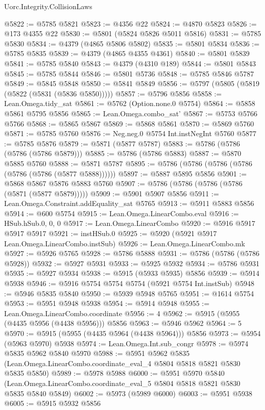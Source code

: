 \begin{lexlean}{Uorc.Integrity.CollisionLaws}
\begin{coremodule}
@5822 := @5785 @5821
@5823 := @4356 @22
@5824 := @4870 @5823
@5826 := @173 @4355 @22
@5830 := @5801 (@5824 @5826 @5011 @5816)
@5831 := @5785 @5830
@5834 := @4379 (@4865 @5806 @5802)
@5835 := @5801 @5834
@5836 := @5785 @5835
@5839 := @4379 (@4865 @4355 @4361)
@5840 := @5801 @5839
@5841 := @5785 @5840
@5843 := @4379 (@4310 @189)
@5844 := @5801 @5843
@5845 := @5785 @5844
@5846 := @5801 @5736
@5848 := @5785 @5846 @5787
@5849 := @5845 @5848
@5850 := @5841 @5849
@5856 := @5797 (@5805 (@5819 (@5822 (@5831 (@5836 @5850)))))
@5857 := @5796 @5856
@5858 := Lean.Omega.tidy_sat
@5861 := @5762 (Option.none.{0} @5754)
@5864 := @5858 @5861 @5795 @5856
@5865 := Lean.Omega.combo_sat'
@5867 := @5753 @5766 @5766
@5868 := @5865 @5867
@5869 := @5868 @5861
@5870 := @5869 @5760
@5871 := @5785 @5760
@5876 := Neg.neg.{0} @5754 Int.instNegInt @5760
@5877 := @5785 @5876
@5879 := @5871 (@5877 @5787)
@5883 := @5786 (@5786 (@5786 (@5786 @5879)))
@5885 := @5786 (@5786 @5883)
@5887 := @5870 @5885 @5760
@5888 := @5871 @5787
@5895 := @5786 (@5786 (@5786 (@5786 (@5786 (@5786 (@5877 @5888))))))
@5897 := @5887 @5895 @5856
@5901 := @5868 @5867 @5876 @5883 @5760
@5907 := @5786 (@5786 (@5786 (@5786 (@5871 (@5877 @5879)))))
@5909 := @5901 @5907 @5856
@5911 := Lean.Omega.Constraint.addEquality_sat @5765
@5913 := @5911 @5883 @5856
@5914 := @600 @5754
@5915 := Lean.Omega.LinearCombo.eval
@5916 := HSub.hSub.{0, 0, 0}
@5917 := Lean.Omega.LinearCombo
@5920 := @5916 @5917 @5917 @5917
@5921 := instHSub.{0}
@5925 := @5920 (@5921 @5917 Lean.Omega.LinearCombo.instSub)
@5926 := Lean.Omega.LinearCombo.mk
@5927 := @5926 @5765
@5928 := @5786 @5888
@5931 := @5786 (@5786 (@5786 @5928))
@5932 := @5927 @5931
@5933 := @5925 @5932
@5934 := @5786 @5931
@5935 := @5927 @5934
@5938 := @5915 (@5933 @5935) @5856
@5939 := @5914 @5938
@5946 := @5916 @5754 @5754 @5754 (@5921 @5754 Int.instSub)
@5948 := @5946 @5835 @5840
@5950 := @5939 @5948 @5765
@5951 := @1614 @5754
@5953 := @5951 @5948 @5938
@5954 := @5914 @5948
@5955 := Lean.Omega.LinearCombo.coordinate
@5956 := 4
@5962 := @5915 (@5955 (@4435 @5956 (@4438 @5956))) @5856
@5963 := @5946 @5962
@5964 := 5
@5970 := @5915 (@5955 (@4435 @5964 (@4438 @5964))) @5856
@5973 := @5954 (@5963 @5970) @5938
@5974 := Lean.Omega.Int.sub_congr
@5978 := @5974 @5835 @5962 @5840 @5970
@5988 := @5951
    @5962
    @5835
    (Lean.Omega.LinearCombo.coordinate_eval_4 @5804 @5818 @5821 @5830 @5835 @5850)
@5989 := @5978 @5988
@6000 := @5951
    @5970
    @5840
    (Lean.Omega.LinearCombo.coordinate_eval_5 @5804 @5818 @5821 @5830 @5835 @5840 @5849)
@6002 := @5973 (@5989 @6000)
@6003 := @5951 @5938
@6005 := @5915 @5932 @5856

\end{coremodule}
\end{lexlean}
